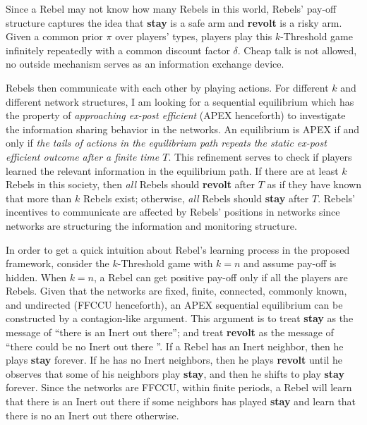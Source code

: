 \documentclass[12pt,letter]{article}
\theoremstyle{definition}
\theoremstyle{remark}
\theoremstyle{claim}
\begin{document}
Since a Rebel may not know how many Rebels in this world, Rebels' pay-off structure captures the idea that \textbf{stay} is a safe arm and \textbf{revolt} is a risky arm. Given a common prior $\pi$ over players' types, players play this $k$-Threshold game infinitely repeatedly with a common discount factor $\delta$. Cheap talk is not allowed, no outside mechanism serves as an information exchange device. 

Rebels then communicate with each other by playing actions. For different $k$ and different network structures, I am looking for a sequential equilibrium which has the property of \textit{approaching ex-post efficient} (APEX henceforth) to investigate the information sharing behavior in the networks. An equilibrium is APEX if and only if \textit{the tails of actions in the equilibrium path repeats the static ex-post efficient outcome after a finite time $T$}.  This refinement serves to check if players learned the relevant information in the equilibrium path. If there are at least $k$ Rebels in this society, then \textit{all} Rebels should \textbf{revolt} after $T$ as if they have known that more than $k$ Rebels exist; otherwise, \textit{all} Rebels should \textbf{stay} after $T$. Rebels' incentives to communicate are affected by Rebels' positions in networks since networks are structuring the information and monitoring structure.

In order to get a quick intuition about Rebel's learning process in the proposed framework, consider the $k$-Threshold game with $k=n$ and assume pay-off is hidden. When $k=n$, a Rebel can get positive pay-off only if all the players are Rebels. Given that the networks are fixed, finite, connected, commonly known, and undirected (FFCCU henceforth), an APEX sequential equilibrium can be constructed by a contagion-like argument. This argument is to treat \textbf{stay} as the message of ``there is an Inert out there''; and treat \textbf{revolt} as the message of ``there could be no Inert out there ''. If a Rebel has an Inert neighbor, then he plays \textbf{stay} forever. If he has no Inert neighbors, then he plays \textbf{revolt} until he observes that some of his neighbors play \textbf{stay}, and then he shifts to play \textbf{stay} forever. Since the networks are FFCCU,  within finite periods, a Rebel will learn that there is an Inert out there if some neighbors has played \textbf{stay} and learn that there is no an Inert out there otherwise.
\end{document}
